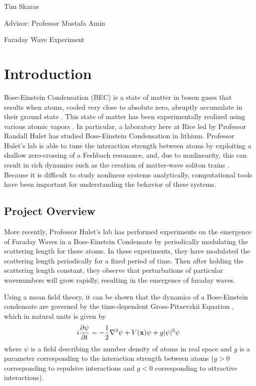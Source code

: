 \documentclass[12]{article}
\begin{document}
\begin{flushright}
Tim Skaras

Advisor: Professor Mustafa Amin
\end{flushright}

\begin{center}
{\LARGE Faraday Wave Experiment}
\end{center}

\section{Introduction}

Bose-Einstein Condensation (BEC) is a state of matter in boson gases that results when atoms, cooled very close to absolute zero, abruptly accumulate in their ground state \cite{schroeder1999introduction}. This state of matter has been experimentally realized using various atomic vapors \cite{pethick2008bose}. In particular, a laboratory here at Rice led by Professor Randall Hulet has studied Bose-Einstein Condensation in lithium. Professor Hulet's lab is able to tune the interaction strength between atoms by exploiting a shallow zero-crossing of a Feshbach resonance, and, due to nonlinearity, this can result in rich dynamics such as the creation of matter-wave soliton trains \cite{nguyen2017formation}. Because it is difficult to study nonlinear systems analytically, computational tools have been important for understanding the behavior of these systems.

\subsection{Project Overview}

More recently, Professor Hulet's lab has performed experiments on the emergence of Faraday Waves in a Bose-Einstein Condensate by periodically modulating the scattering length for these atoms. In these experiments, they have modulated the scattering length periodically for a fixed period of time. Then after holding the scattering length constant, they observe that perturbations of particular wavenumbers will grow rapidly, resulting in the emergence of faraday waves.

Using a mean field theory, it can be shown that the dynamics of a Bose-Einstein condensate are governed by the time-dependent Gross-Pitaevskii Equation \cite{pethick2008bose}, which in natural units is given by
\begin{equation}
i \pdv{\psi}{t} = -\frac{1}{2}\laplacian{\psi} + V(\vb{x})\psi + g |\psi|^2 \psi
\label{GPE3D}
\end{equation}
\nolinebreak
where $\psi$ is a field describing the number density of atoms in real space and $g$ is a parameter corresponding to the interaction strength between atoms ($g>0$ corresponding to repulsive interactions and $g < 0$ corresponding to attractive interactions).
\end{document}
